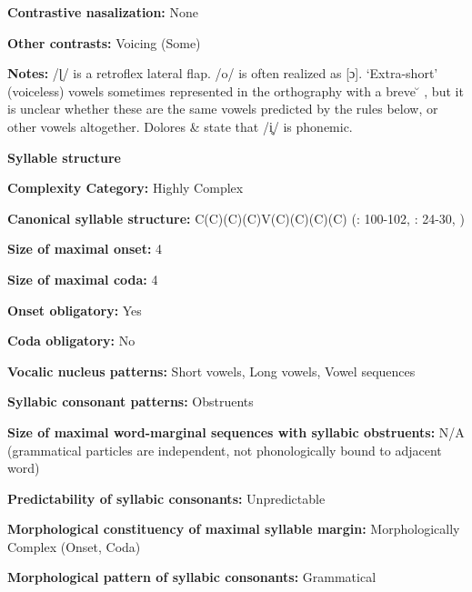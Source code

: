 \textbf{Contrastive nasalization:} None



\textbf{Other contrasts:} Voicing (Some)



\textbf{Notes:} /ɭ/ is a retroflex lateral flap. /o/ is often realized as [ɔ]. ‘Extra-short’ (voiceless) vowels sometimes represented in the orthography with a breve  \u{} , but it is unclear whether these are the same vowels predicted by the rules below, or other vowels altogether. Dolores \& \citet[236]{Mathiot1991} state that /i̥/ is phonemic.



\textbf{Syllable structure}



\textbf{Complexity Category:} Highly Complex



\textbf{Canonical syllable structure:} C(C)(C)(C)V(C)(C)(C)(C) (\citealt{Saxton1982}: 100-102, \citealt{Hale1959}: 24-30, \citealt{HillZepeda1992})



\textbf{Size of maximal onset:} 4



\textbf{Size of maximal coda:} 4



\textbf{Onset obligatory:} Yes



\textbf{Coda obligatory:} No



\textbf{Vocalic nucleus patterns:} Short vowels, Long vowels, Vowel sequences



\textbf{Syllabic consonant patterns:} Obstruents



\textbf{Size of maximal word{}-marginal sequences with syllabic obstruents:} N/A (grammatical particles are independent, not phonologically bound to adjacent word)



\textbf{Predictability of syllabic consonants:} Unpredictable



\textbf{Morphological constituency of maximal syllable margin:} Morphologically Complex (Onset, Coda)



\textbf{Morphological pattern of syllabic consonants:} Grammatical



